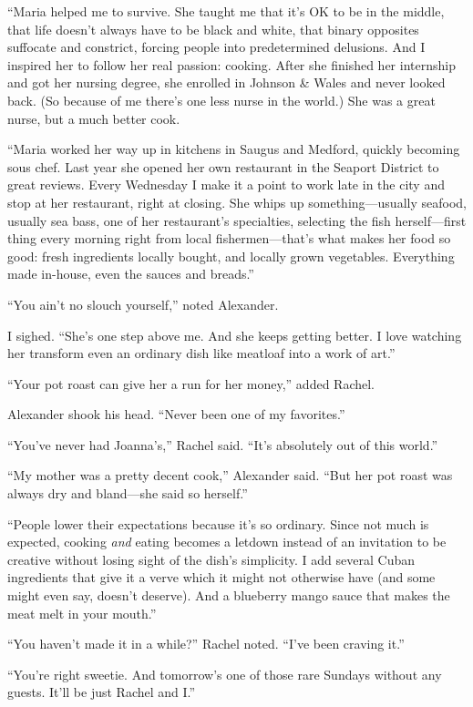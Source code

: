 ``Maria helped me to survive. She taught me that it's OK to be in the
middle, that life doesn't always have to be black and white, that binary
opposites suffocate and constrict, forcing people into predetermined
delusions. And I inspired her to follow her real passion: cooking. After
she finished her internship and got her nursing degree, she enrolled in
Johnson \& Wales and never looked back. (So because of me there's one
less nurse in the world.) She was a great nurse, but a much better cook.

``Maria worked her way up in kitchens in Saugus and Medford, quickly
becoming sous chef. Last year she opened her own restaurant in the
Seaport District to great reviews. Every Wednesday I make it a point to
work late in the city and stop at her restaurant, right at closing. She
whips up something---usually seafood, usually sea bass, one of her
restaurant's specialties, selecting the fish herself---first thing every
morning right from local fishermen---that's what makes her food so good:
fresh ingredients locally bought, and locally grown vegetables.
Everything made in-house, even the sauces and breads.''

``You ain't no slouch yourself,'' noted Alexander.

I sighed. ``She's one step above me. And she keeps getting better. I
love watching her transform even an ordinary dish like meatloaf into a
work of art.''

``Your pot roast can give her a run for her money,'' added Rachel.

Alexander shook his head. ``Never been one of my favorites.''

``You've never had Joanna's,'' Rachel said. ``It's absolutely out of
this world.''

``My mother was a pretty decent cook,'' Alexander said. ``But her pot
roast was always dry and bland---she said so herself.''

``People lower their expectations because it's so ordinary. Since not
much is expected, cooking \emph{and} eating becomes a letdown instead of
an invitation to be creative without losing sight of the dish's
simplicity. I add several Cuban ingredients that give it a verve which
it might not otherwise have (and some might even say, doesn't deserve).
And a blueberry mango sauce that makes the meat melt in your mouth.''

``You haven't made it in a while?'' Rachel noted. ``I've been craving
it.''

``You're right sweetie. And tomorrow's one of those rare Sundays without
any guests. It'll be just Rachel and I.''

